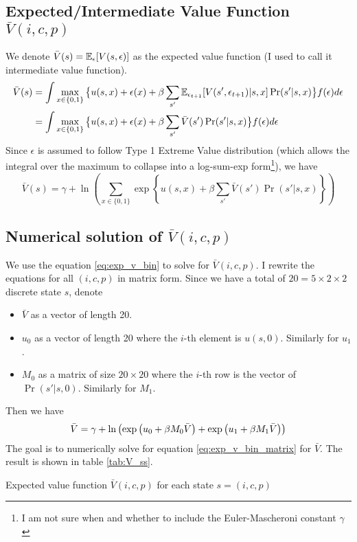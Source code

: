 \documentclass[12pt]{article}[margin=1in]
\begin{document}
\subsection{Expected/Intermediate Value Function $\bar{V}(i,c,p)$}
We denote $\bar{V}(s) = \mathbb{E}_{\epsilon}[V(s,\epsilon)]$ as the expected value function (I used to call it intermediate value function).
\begin{equation}\label{eq:exp_v}
    \begin{split}
        \bar{V}(s) & =\int \max_{x \in \{0,1\}} \big\{ u(s,x) + \epsilon(x)+ \beta \sum_{s'}\mathbb{E}_{\epsilon_{t+1}}[V(s',\epsilon_{t+1})|s,x] \Pr(s'|s,x)\big\}  f(\epsilon) d\epsilon \\
                   & =\int \max_{x \in \{0,1\}} \big\{ u(s,x) + \epsilon(x)+ \beta \sum_{s'}\bar{V}(s') \Pr(s'|s,x)\big\}  f(\epsilon) d\epsilon
    \end{split}
\end{equation}
Since $\epsilon$ is assumed to follow Type 1 Extreme Value distribution (which allows the integral over the maximum to collapse into a log-sum-exp form\footnote{I am not sure when and whether to include the Euler-Mascheroni constant $\gamma$}), we have
\begin{equation} \label{eq:exp_v_bin}
    \bar{V}(s) = \gamma+\ln\left(\sum_{x \in \{0,1\}} \exp\left\{ u(s,x) + \beta \sum_{s'}\bar{V}(s') \Pr(s'|s,x)\right\}\right)
\end{equation}

\subsection{Numerical solution of $\bar{V}(i,c,p)$}
We use the equation \ref{eq:exp_v_bin} to solve for $\bar{V}(i,c,p)$.  I rewrite the equations for all $(i,c,p)$ in matrix form. Since we have a total of $20=5\times 2\times 2$ discrete state $s$, denote
\begin{itemize}
    \item $\bar{V}$ as a vector of length 20.
    \item $u_0$ as a vector of length 20 where the $i$-th element is $u(s,0)$. Similarly for $u_1$.
    \item $M_0$ as a matrix of size $20 \times 20$ where the $i$-th row is the vector of $\Pr(s'|s,0)$. Similarly for $M_1$.
\end{itemize}
Then we have
\begin{equation}\label{eq:exp_v_bin_matrix}
    \bar{V}= \gamma + \ln\left(\exp\left(u_0 + \beta M_0 \bar{V}\right) + \exp\left(u_1 + \beta M_1 \bar{V}\right)\right)
\end{equation}
The goal is to numerically solve for equation \ref{eq:exp_v_bin_matrix} for $\bar{V}$. The result is shown in table \ref{tab:V_ss}.
\newpage
\begin{table} \fontsize{6pt}{8pt}\selectfont
    \centering
    
    \caption{Expected value function $\bar{V}(i,c,p)$ for each state $s=(i,c,p)$}
    \label{tab:V_ss}
\end{table}
\newpage
\end{document}
